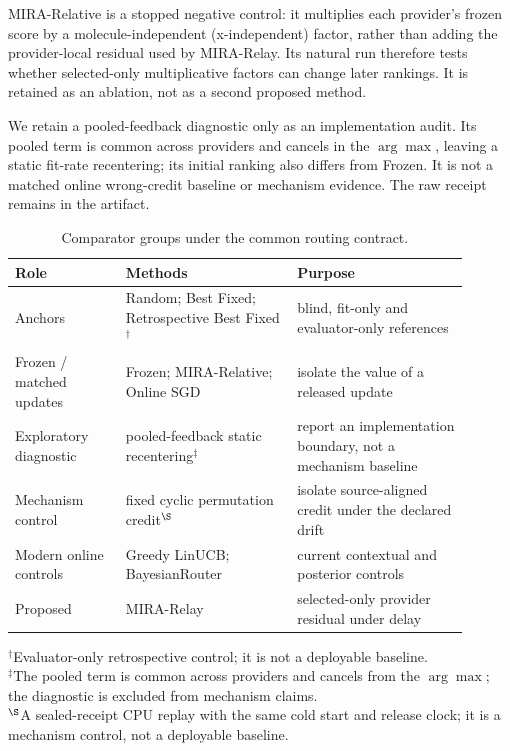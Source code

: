 \documentclass[sigconf,anonymous]{aamas}
\begin{document}
MIRA-Relative is a stopped negative control: it multiplies each provider's frozen score by a molecule-independent (x-independent) factor, rather than adding the provider-local residual used by MIRA-Relay. Its natural run therefore tests whether selected-only multiplicative factors can change later rankings. It is retained as an ablation, not as a second proposed method.

We retain a pooled-feedback diagnostic only as an implementation audit. Its
pooled term is common across providers and cancels in the $\arg\max$, leaving
a static fit-rate recentering; its initial ranking also differs from Frozen. It
is not a matched online wrong-credit baseline or mechanism evidence. The raw
receipt remains in the artifact.

\begin{table}[t]
\caption{Comparator groups under the common routing contract.}
\label{tab:baselines}
\footnotesize
\begin{tabular}{@{}P{0.22\linewidth}P{0.34\linewidth}P{0.34\linewidth}@{}}
\toprule
Role & Methods & Purpose \\
\midrule
Anchors & Random; Best Fixed; Retrospective Best Fixed$^{\dagger}$ & blind, fit-only and evaluator-only references \\
Frozen / matched updates & Frozen; MIRA-Relative; Online SGD & isolate the value of a released update \\
Exploratory diagnostic & pooled-feedback static recentering$^{\ddagger}$ & report an implementation boundary, not a mechanism baseline \\
Mechanism control & fixed cyclic permutation credit$^{\S}$ & isolate source-aligned credit under the declared drift \\
Modern online controls & Greedy LinUCB; BayesianRouter & current contextual and posterior controls \\
Proposed & MIRA-Relay & selected-only provider residual under delay \\
\bottomrule
\end{tabular}
\begin{flushleft}
\footnotesize $^{\dagger}$Evaluator-only retrospective control; it is not a deployable baseline.
\\[-2pt]
\footnotesize $^{\ddagger}$The pooled term is common across providers and cancels from the $\arg\max$; the diagnostic is excluded from mechanism claims.
\\[-2pt]
\footnotesize $^{\S}$A sealed-receipt CPU replay with the same cold start and release clock; it is a mechanism control, not a deployable baseline.
\end{flushleft}
\end{table}
\end{document}
